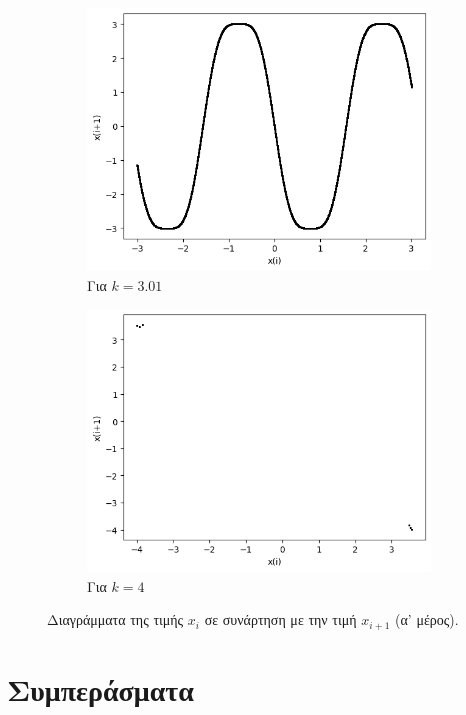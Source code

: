 \begin{figure}[ht]
\begin{subfigure}[b]{0.4\textwidth}
		\includegraphics[width=\textwidth]{LateX images/sine q=-0.5/g20}
		\caption{Για $k=3.01$}
		\label{f:k131}
	\end{subfigure}
	\hfill
	\begin{subfigure}[b]{0.4\textwidth}
		\centering
		\includegraphics[width=\textwidth]{LateX images/sine q=-0.5/g21}
		\caption{Για $k=4$}
		\label{f:k132}
	\end{subfigure}
	\hfill			
	\caption{Διαγράμματα της τιμής \(x_i\) σε συνάρτηση με την τιμή \(x_{i+1}\) (α' μέρος).}
	\label{f:g58}
\end{figure}

\clearpage

\section{Συμπεράσματα}

